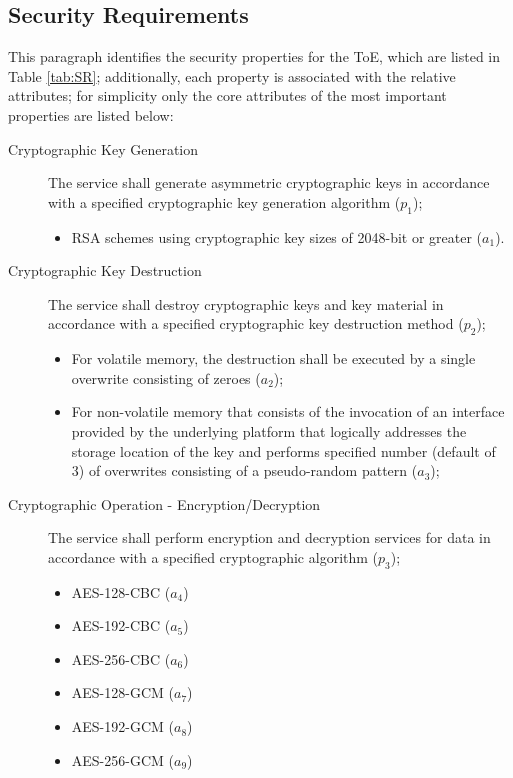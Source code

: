 \subsection{Security Requirements}
This paragraph identifies the security properties for the ToE, which are listed in Table \ref{tab:SR}; additionally, each property is associated with the relative attributes; for simplicity only the core attributes of the most important properties are listed below:

\begin{description}
    \item[Cryptographic Key Generation] The service shall generate asymmetric cryptographic keys in accordance with a specified cryptographic key generation algorithm (\(p_1\));
    \begin{itemize}
        \item RSA schemes using cryptographic key sizes of 2048-bit or greater (\(a_1\)).
    \end{itemize}
    \item[Cryptographic Key Destruction] The service shall destroy cryptographic keys and key material in accordance with a specified cryptographic key destruction method (\(p_2\));
    \begin{itemize}
        \item For volatile memory, the destruction shall be executed by a single overwrite consisting of zeroes (\(a_2\));
        \item For non-volatile memory that consists of the invocation of an interface provided by the underlying platform that logically addresses the storage location of the key and performs specified number (default of 3) of overwrites consisting of a pseudo-random pattern (\(a_3\));
    \end{itemize}
    \item[Cryptographic Operation - Encryption/Decryption] The service shall perform encryption and decryption services for data in accordance with a specified cryptographic algorithm (\(p_3\));
    \begin{itemize}
        \item AES-128-CBC (\(a_4\))
        \item AES-192-CBC (\(a_5\))
        \item AES-256-CBC (\(a_6\))
        \item AES-128-GCM (\(a_7\))
        \item AES-192-GCM (\(a_8\))
        \item AES-256-GCM (\(a_9\))

\end{itemize}
\end{description}
